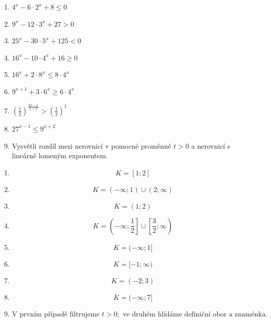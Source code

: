 \documentclass[11pt,a4paper]{article}
\begin{document}
\begin{zadaniReseniBox}[title={Domácí úkol}]
\begin{enumerate}[label=\alph*)]
\item $4^x-6\cdot2^x+8\le0$
\item $9^x-12\cdot3^x+27>0$
\item $25^x-30\cdot5^x+125<0$
\item $16^x-10\cdot4^x+16\ge0$
\item $16^x+2\cdot8^x\le8\cdot4^x$
\item $9^{x+1}+3\cdot6^x\ge6\cdot4^x$
\item $\left(\frac12\right)^{\frac{2x-1}{x+2}}>\left(\frac12\right)^1$
\item $27^{x-1}\le9^{x+2}$
\item Vysvětli rozdíl mezi nerovnicí v pomocné proměnné $t>0$ a nerovnicí s lineárně lomeným exponentem.
\end{enumerate}
\tcblower
\begin{enumerate}[label=\alph*)]
\item \[K=[1;2]\]
\item \[K=(-\infty;1)\cup(2;\infty)\]
\item \[K=(1;2)\]
\item \[K=\left(-\infty;\frac12\right]\cup\left[\frac32;\infty\right)\]
\item \[K=(-\infty;1]\]
\item \[K=[-1;\infty)\]
\item \[K=(-2;3)\]
\item \[K=(-\infty;7]\]
\item \[\text{V prvním případě filtrujeme }t>0;\text{ ve druhém hlídáme definiční obor a znaménka.}\]
\end{enumerate}
\end{zadaniReseniBox}
\end{document}
